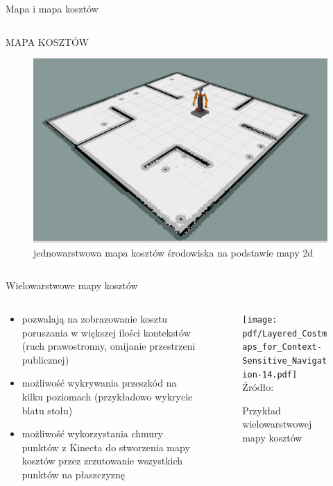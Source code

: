 \begin{frame}{Mapa i mapa kosztów}
\begin{columns}
\begin{column}{0.5\textwidth}
			\begin{center}
				MAPA KOSZTÓW
				\begin{figure}
					\centering
					\includegraphics[height=0.55\textheight]{img/costmapa.png}
					\caption{jednowarstwowa mapa kosztów środowiska na podstawie mapy 2d}
				\end{figure}
			\end{center}
		\end{column}
	\end{columns}
\end{frame}

\begin{frame}
{Wielowarstwowe mapy kosztów}
\begin{columns}
		\begin{column}{0.5\textwidth}
			\begin{itemize}
				\item pozwalają na zobrazowanie kosztu poruszania w większej ilości kontekstów (ruch prawostronny, omijanie przestrzeni publicznej)
				\item możliwość wykrywania przeszkód na kilku poziomach (przykładowo wykrycie blatu stołu)
				\item możliwość wykorzystania chmury punktów z Kinecta do stworzenia mapy kosztów przez zrzutowanie wszystkich punktów na płaszczyznę
			\end{itemize}
		\end{column}
		\begin{column}{0.5\textwidth}  %
			\begin{figure}
				\begin{center}
					\texttt{[image: pdf/Layered\_Costmaps\_for\_Context-Sensitive\_Navigation-14.pdf]}
					\hspace*{5pt}\hbox{\scriptsize{Źródło:}}
					\caption{Przykład wielowarstwowej mapy kosztów }
				\end{center}
			\end{figure}
		\end{column}
	\end{columns}
\end{frame}


